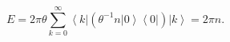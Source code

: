 \begin{equation}
E=2\pi\theta\sum_{k=0}^{\infty}\left\langle k\right| \left( \theta
^{-1}n\left| 0\right\rangle \left\langle 0\right| \right) \left|
k\right\rangle =2\pi n. \label{E3}%
\end{equation}

